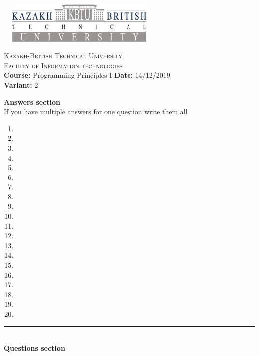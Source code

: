 \documentclass[10pt]{article}
\begin{document}
\begin{center}
\includegraphics[width=8cm, height=2cm]{kbtu.jpg}
\end{center}

\begin{center}
	\begin{minipage}{11.4cm}
		\begin{center}
				{\small \textsc{Kazakh-British Technical University}			\\
						  \textsc{Faculty of Information technologies} \\
                         \textbf{Course:} Programming Principles I \hspace{.65cm}
                         \textbf{Date:} 14/12/2019\\\textbf{Variant:} 2\\
                }
		\end{center}
	\end{minipage}
\end{center}
\textbf{
{Answers section}\\
}
{If you have multiple answers for one question write them all}
\begin{multicols}{5}
\begin{enumerate}
\item \item \item \item \item \item \item \item \item \item \item \item \item \item \item \item \item \item \item \item
\end{enumerate}
\end{multicols}
\medskip\hrule
\textbf{
\\
{Questions section}\\
}
\end{document}
